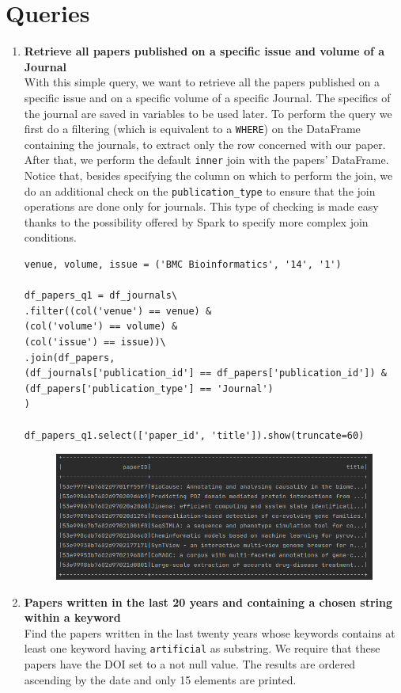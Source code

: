 \section{Queries}
\label{sec:queries_spark}%
\begin{enumerate}
    \item \textbf{Retrieve all papers published on a specific issue and volume of a Journal} \\
    With this simple query, we want to retrieve all the papers published on a specific issue and on a specific volume of a specific Journal.
    The specifics of the journal are saved in variables to be used later.
    To perform the query we first do a filtering (which is equivalent to a \verb|WHERE|) on the DataFrame containing the journals, to extract only the row concerned with our paper.
    After that, we perform the default \verb|inner| join with the papers' DataFrame.
    Notice that, besides specifying the column on which to perform the join, we do an additional check on the \verb|publication_type| to ensure that the join operations are done only for journals.
    This type of checking is made easy thanks to the possibility offered by Spark to specify more complex join conditions.
    \begin{lstlisting}[label={lst:query1spark}]
venue, volume, issue = ('BMC Bioinformatics', '14', '1')

df_papers_q1 = df_journals\
.filter((col('venue') == venue) &
(col('volume') == volume) &
(col('issue') == issue))\
.join(df_papers,
(df_journals['publication_id'] == df_papers['publication_id']) &
(df_papers['publication_type'] == 'Journal')
)

df_papers_q1.select(['paper_id', 'title']).show(truncate=60)
    \end{lstlisting}
    \begin{figure}[H]
        \begin{center}
            \includegraphics[width=0.9\linewidth]{ImagesSpark/query1spark}
            \label{fig:query1spark}%
        \end{center}
    \end{figure}
    \item \textbf{Papers written in the last 20 years and containing a chosen string within a keyword} \\
    Find the papers written in the last twenty years whose keywords contains at least one keyword having \verb|artificial| as substring.
    We require that these papers have the DOI set to a not null value.
    The results are ordered ascending by the date and only 15 elements are printed.


\end{enumerate}
